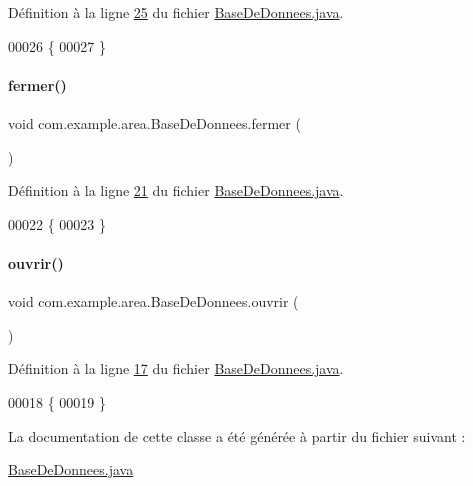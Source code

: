 Définition à la ligne \hyperlink{_base_de_donnees_8java_source_l00025}{25} du fichier \hyperlink{_base_de_donnees_8java_source}{Base\+De\+Donnees.\+java}.


\begin{DoxyCode}
00026   \{
00027   \}
\end{DoxyCode}
\mbox{\label{classcom_1_1example_1_1area_1_1_base_de_donnees_ad51319bd8b62ebf33d33d6f3b8347d41}} 
\paragraph{\texorpdfstring{fermer()}{fermer()}}
{\footnotesize\ttfamily void com.\+example.\+area.\+Base\+De\+Donnees.\+fermer (\begin{DoxyParamCaption}{ }\end{DoxyParamCaption})}



Définition à la ligne \hyperlink{_base_de_donnees_8java_source_l00021}{21} du fichier \hyperlink{_base_de_donnees_8java_source}{Base\+De\+Donnees.\+java}.


\begin{DoxyCode}
00022   \{
00023   \}
\end{DoxyCode}
\mbox{\label{classcom_1_1example_1_1area_1_1_base_de_donnees_a71c0a57c6fe4a5097e4d4c7ef1585cf3}} 
\paragraph{\texorpdfstring{ouvrir()}{ouvrir()}}
{\footnotesize\ttfamily void com.\+example.\+area.\+Base\+De\+Donnees.\+ouvrir (\begin{DoxyParamCaption}{ }\end{DoxyParamCaption})}



Définition à la ligne \hyperlink{_base_de_donnees_8java_source_l00017}{17} du fichier \hyperlink{_base_de_donnees_8java_source}{Base\+De\+Donnees.\+java}.


\begin{DoxyCode}
00018   \{
00019   \}
\end{DoxyCode}


La documentation de cette classe a été générée à partir du fichier suivant \+:\begin{DoxyCompactItemize}
\item 
\hyperlink{_base_de_donnees_8java}{Base\+De\+Donnees.\+java}\end{DoxyCompactItemize}
